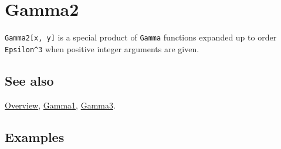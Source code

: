 \documentclass[../FeynCalcManual.tex]{subfiles}
\begin{document}
\hypertarget{gamma2}{
\section{Gamma2}\label{gamma2}}

\texttt{Gamma2[\allowbreak{}x,\ \allowbreak{}y]} is a special product of
\texttt{Gamma} functions expanded up to order \texttt{Epsilon^3} when
positive integer arguments are given.

\subsection{See also}

\hyperlink{toc}{Overview}, \hyperlink{gamma1}{Gamma1},
\hyperlink{gamma3}{Gamma3}.

\subsection{Examples}
\end{document}
